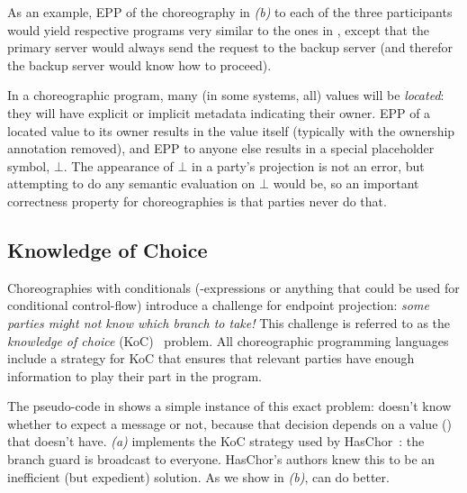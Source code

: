 As an example, EPP of the choreography in \emph{(b)} to each of the three participants
would yield respective programs very similar to the ones in ,
except that the primary server would always send the request to the backup server
(and therefor the backup server would know how to proceed).

In a choreographic program, many (in some systems, all) values will be \emph{located}:
they will have explicit or implicit metadata indicating their owner.
EPP of a located value to its owner results in the value itself
(typically with the ownership annotation removed),
and EPP to anyone else results in a special placeholder symbol, \eg $\bot$.
The appearance of $\bot$ in a party's projection is not an error,
but attempting to do any semantic evaluation on $\bot$ would be,
so an important correctness property for choreographies is that parties never do that.

\subsection{Knowledge of Choice}
\label{sec:knowledge-of-choice}

Choreographies with conditionals
(-expressions or anything that could be used for conditional control-flow)
introduce
a challenge for endpoint projection:
\emph{some parties might not know which branch to take!}
This challenge is referred to as the \emph{knowledge of choice}  (KoC)~\cite{castagna-knowledge-of-choice} problem.
All choreographic programming languages include a strategy for KoC
that ensures that relevant parties have enough information to play their part in the program.

The pseudo-code in  shows a simple instance of this exact problem:
 doesn't know whether to expect a message or not,
because that decision depends on a value () that  doesn't have.
\emph{(a)} implements the KoC strategy used by HasChor~\cite{shen-haschor}: the branch guard is broadcast to everyone.
HasChor's authors knew this to be an inefficient (but expedient) solution.
As we show in \emph{(b)}, \MultiChor can do better.

